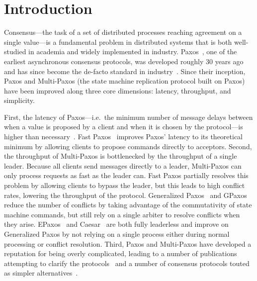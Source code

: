 \section{Introduction}
Consensus---the task of a set of distributed processes reaching agreement on a
single value---is a fundamental problem in distributed systems that is both
well-studied in academia and widely implemented in industry.
Paxos~\cite{lamport1998part}, one of the earliest asynchronous consensus
protocols, was developed roughly 30 years ago and has since become the de-facto
standard in industry~\cite{burrows2006chubby, chandra2007paxos,
baker2011megastore, corbett2013spanner}. Since their inception, Paxos and
Multi-Paxos (the state machine replication protocol built on Paxos) have been
improved along three core dimensions: latency, throughput, and simplicity.

First, the latency of Paxos---i.e.\ the minimum number of message delays
between when a value is proposed by a client and when it is chosen by the
protocol---is higher than necessary~\cite{lamport2006lower}. Fast
Paxos~\cite{lamport2006fast} improves Paxos' latency to its theoretical minimum
by allowing clients to propose commands directly to acceptors.
%
Second, the throughput of Multi-Paxos is bottlenecked by the throughput of a
single leader. Because all clients send messages directly to a leader,
Multi-Paxos can only process requests as fast as the leader can. Fast Paxos
partially resolves this problem by allowing clients to bypass the leader, but
this leads to high conflict rates, lowering the throughput of the protocol.
Generalized Paxos~\cite{lamport2005generalized} and GPaxos~\cite{sutra2011fast}
reduce the number of conflicts by taking advantage of the commutativity of
state machine commands, but still rely on a single arbiter to resolve conflicts
when they arise. EPaxos~\cite{moraru2013there, moraru2013proof} and
Caesar~\cite{arun2017speeding} are both fully leaderless and improve on
Generalized Paxos by not relying on a single process either during normal
processing or conflict resolution.
%
Third, Paxos and Multi-Paxos have developed a reputation for being overly
complicated, leading to a number of publications attempting to clarify the
protocols~\cite{lamport2001paxos, lampson2001abcd, mazieres2007paxos,
van2015paxos} and a number of consensus protocols touted as simpler
alternatives~\cite{ongaro2014search, rystsov2018caspaxos}.

